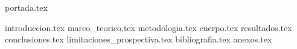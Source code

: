 \documentclass[a4paper,openany,oneside,12pt]{report}
\begin{document}
  {portada.tex}
  \setcounter{page}{2} %
  \tableofcontents
  \listoffigures 
  \listoftables 
  {introduccion.tex}
  {marco_teorico.tex}
  {metodologia.tex}
  {cuerpo.tex}
  {resultados.tex}
  {conclusiones.tex}
  {limitaciones_prospectiva.tex}
  {bibliografia.tex}
  {anexos.tex}
\end{document}
